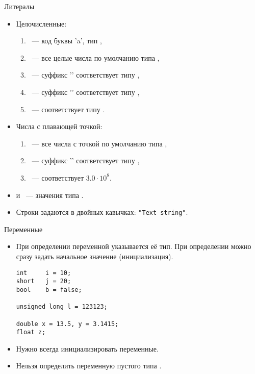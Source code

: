 \documentclass[aspectration=1610,t]{beamer}
\begin{document}
\begin{frame}[fragile]{Литералы}
\begin{itemize}
    \item Целочисленные:
        \begin{enumerate}
            \item {}~--- код буквы 'a', тип ,
            \item {} ~--- все целые числа по умолчанию типа ,
            \item {}~--- суффикс '' соответствует типу ,
            \item {}~--- суффикс '' соответствует типу ,
            \item {}~--- соответствует типу .
        \end{enumerate}

    \item Числа с плавающей точкой:
        \begin{enumerate}
            \item {}~--- 
                все числа с точкой по умолчанию типа ,
            \item {}~--- суффикс '' соответствует типу 
                ,
            \item {}~--- соответствует $3.0\cdot 10^{8}$.
        \end{enumerate}
    \item {} и ~--- значения типа .

    \item Строки задаются в двойных кавычках: \verb!"Text string"!.

\end{itemize}
\end{frame}

\begin{frame}[fragile]{Переменные}
\begin{itemize}
    \item При определении переменной указывается её тип. При определении можно
        сразу задать начальное значение (инициализация).
    \begin{lstlisting}
int     i = 10;
short   j = 20;
bool    b = false;

unsigned long l = 123123;

double x = 13.5, y = 3.1415;
float z;
    \end{lstlisting}

    \item Нужно всегда инициализировать переменные.

    \item Нельзя определить переменную пустого типа .
\end{itemize}
\end{frame}
\end{document}
